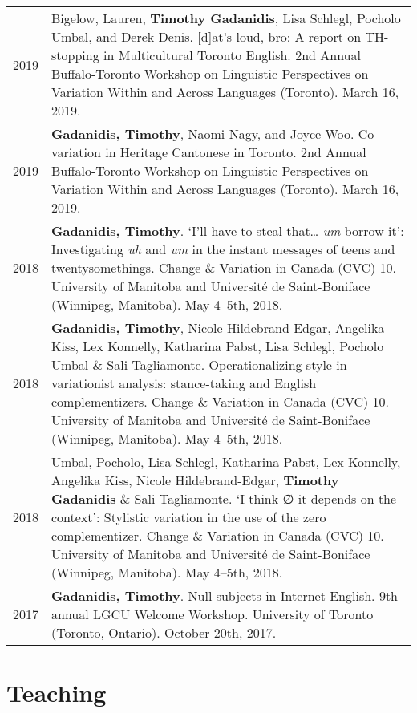 \documentclass[letterpaper]{article}
\begin{document}
\begin{tabular}{p{}p{}}
    2019 & Bigelow, Lauren, \textbf{Timothy Gadanidis}, Lisa Schlegl, Pocholo
    Umbal, and Derek Denis.  [d]at's loud, bro: A report on TH-stopping in
    Multicultural Toronto English.  2nd Annual Buffalo-Toronto Workshop on
    Linguistic Perspectives on Variation Within and Across Languages (Toronto).
    March 16, 2019. \\
    2019 & \textbf{Gadanidis, Timothy}, Naomi Nagy, and Joyce Woo.  Co-variation
    in Heritage Cantonese in Toronto.  2nd Annual Buffalo-Toronto Workshop on
    Linguistic Perspectives on Variation Within and Across Languages (Toronto).
    March 16, 2019. \\
    2018 & \textbf{Gadanidis, Timothy}.  `I'll have to steal that\ldots{}
    \emph{um} borrow it': Investigating \emph{uh} and \emph{um} in the instant
    messages of teens and twentysomethings.  Change \& Variation in Canada (CVC)
    10. University of Manitoba and Université de Saint-Boniface (Winnipeg,
    Manitoba). May 4--5th, 2018. \\
    2018 & \textbf{Gadanidis, Timothy}, Nicole Hildebrand-Edgar, Angelika Kiss,
    Lex Konnelly, Katharina Pabst, Lisa Schlegl, Poc\-holo Umbal \& Sali
    Tagliamonte.  Operationalizing style in variationist analysis: stance-taking
    and English complementizers.  Change \& Variation in Canada (CVC) 10.
    University of Manitoba and Université de Saint-Boniface (Winnipeg,
    Manitoba). May 4--5th, 2018. \\
    2018 & Umbal, Pocholo, Lisa Schlegl, Katharina Pabst, Lex Konnelly, Angelika
    Kiss, Nicole Hildebrand-Edgar, \textbf{Timothy Gadanidis} \& Sali
    Tagliamonte.  `I think ∅ it depends on the context': Stylistic variation in
    the use of the zero complementizer.  Change \& Variation in Canada (CVC) 10.
    University of Manitoba and Université de Saint-Boniface (Winnipeg,
    Manitoba). May 4--5th, 2018. \\
    2017 & \textbf{Gadanidis, Timothy}.  Null subjects in Internet English.  9th
    annual LGCU Welcome Workshop. University of Toronto (Toronto, Ontario).
    October 20th, 2017. \\
\end{tabular}

\section*{Teaching}
\end{document}
